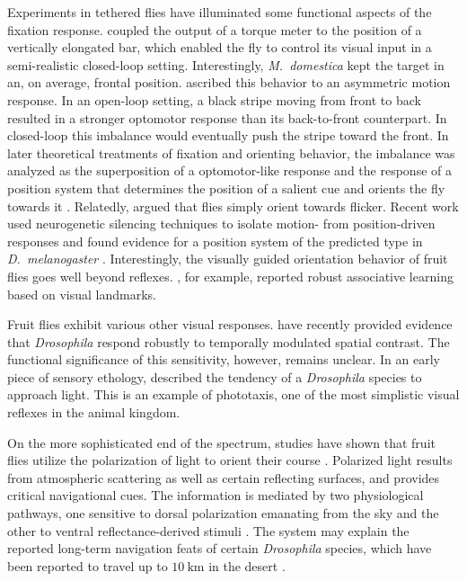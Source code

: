 Experiments in tethered flies have illuminated some functional aspects of the fixation response. \citet{Reichardt:1969aa} coupled the output of a torque meter to the position of a vertically elongated bar, which enabled the fly to control its visual input in a semi-realistic closed-loop setting. Interestingly, \textit{M.\ domestica} kept the target in an, on average, frontal position. \citet{Reichardt:1973aa} ascribed this behavior to an asymmetric motion response. In an open-loop setting, a black stripe moving from front to back resulted in a stronger optomotor response than its back-to-front counterpart. In closed-loop this imbalance would eventually push the stripe toward the front. In later theoretical treatments of fixation and orienting behavior, the imbalance was analyzed as the superposition of a optomotor-like response and the response of a position system that determines the position of a salient cue and orients the fly towards it \citep{Poggio:1973aa}. Relatedly, \citet{Pick:1974aa} argued that flies simply orient towards flicker. Recent work used neurogenetic silencing techniques to isolate motion- from position-driven responses and found evidence for a position system of the predicted type in \textit{D.\ melanogaster} \citep{Bahl:2013ha}. Interestingly, the visually guided orientation behavior of fruit flies goes well beyond reflexes. \citet{Ofstad:2011aa}, for example, reported robust associative learning based on visual landmarks.

Fruit flies exhibit various other visual responses. \citet{Bahl:2015cqa} have recently provided evidence that \textit{Drosophila} respond robustly to temporally modulated spatial contrast. The functional significance of this sensitivity, however, remains unclear. In an early piece of sensory ethology, \citet{Carpenter:1905aa} described the tendency of a \textit{Drosophila} species to approach light. This is an example of phototaxis, one of the most simplistic visual reflexes in the animal kingdom.

On the more sophisticated end of the spectrum, studies have shown that fruit flies utilize the polarization of light to orient their course \citep{Weir:2012aa}. Polarized light results from atmospheric scattering as well as certain reflecting surfaces, and provides critical navigational cues. The information is mediated by two physiological pathways, one sensitive to dorsal polarization emanating from the sky and the other to ventral reflectance-derived stimuli \citep{Wernet:2012aa}. The system may explain the reported long-term navigation feats of certain \textit{Drosophila} species, which have been reported to travel up to $\SI{10}{\kilo\metre}$ in the desert \citep{Dickinson:2014aa}.

